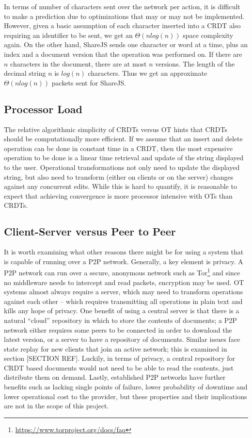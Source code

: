 \documentclass[12pt,a4paper,twoside,openright]{report}
\begin{document}
	In terms of number of characters sent over the network per action, it is difficult to make a prediction due to optimizations that may or may not be implemented. However, given a basic assumption of each character inserted into a CRDT also requiring an identifier to be sent, we get an $\Theta(nlog(n))$ space complexity again. On the other hand, ShareJS sends one character or word at a time, plus an index and a document version that the operation was performed on. If there are $n$ characters in the document, there are at most $n$ versions. The length of the decimal string $n$ is $log(n)$ characters. Thus we get an approximate $\Theta(nlog(n))$ packets sent for ShareJS.
	
	\subsection{Processor Load}
	
	The relative algorithmic simplicity of CRDTs versus OT hints that CRDTs should be computationally more efficient. If we assume that an insert and delete operation can be done in constant time in a CRDT, then the most expensive operation to be done is a linear time retrieval and update of the string displayed to the user. Operational transformations not only need to update the displayed string, but also need to transform (either on clients or on the server) changes against any concurrent edits. While this is hard to quantify, it is reasonable to expect that achieving convergence is more processor intensive with OTs than CRDTs.
	
	
	\subsection{Client-Server versus Peer to Peer}
	
	It is worth examining what other reasons there might be for using a system that is capable of running over a P2P network. Generally, a key element is privacy. A P2P network can run over a secure, anonymous network such as Tor\footnote{\url{https://www.torproject.org/docs/faq}} and since no middleware needs to intercept and read packets, encryption may be used. OT systems almost always require a server, which may need to transform operations against each other – which requires transmitting all operations in plain text and kills any hope of privacy. One benefit of using a central server is that there is a natural “cloud” repository in which to store the contents of documents; a P2P network either requires some peers to be connected in order to download the latest version, or a server to have a repository of documents. Similar issues face state replay for new clients that join an active network; this is examined in section [SECTION REF]. Luckily, in terms of privacy, a central repository for CRDT based documents would not need to be able to read the contents, just distribute them on demand. Lastly, established P2P networks have further benefits such as lacking single points of failure, lower probability of downtime and lower operational cost to the provider, but these properties and their implications are not in the scope of this project.
	
\end{document}
